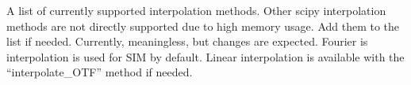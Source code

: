 \documentclass[letterpaper,10pt,english]{sphinxmanual}
\begin{document}
\begin{fulllineitems}
\begin{fulllineitems}
\label{\detokenize{source/OpticalSystems:id0}}
\pysigstartsignatures
\pysigline
{}
\pysigstopsignatures
\sphinxAtStartPar
A list of currently supported interpolation methods.
Other scipy interpolation methods are not directly supported due to high memory usage.
Add them to the list if needed.
Currently, meaningless, but changes are expected.
Fourier is interpolation is used for SIM by default.
Linear interpolation is available with the “interpolate\_OTF” method if needed.

\end{fulllineitems}


\end{fulllineitems}

\end{document}
